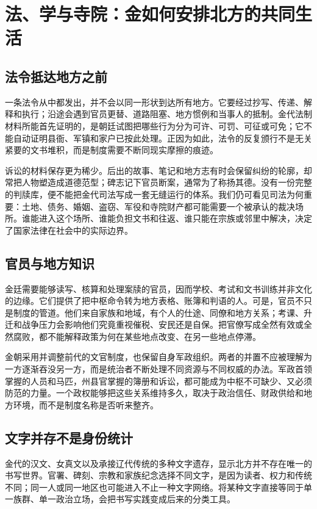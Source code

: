 \section{法、学与寺院：金如何安排北方的共同生活}

\subsection{法令抵达地方之前}

一条法令从中都发出，并不会以同一形状到达所有地方。它要经过抄写、传递、解释和执行；沿途会遇到官员更替、道路阻塞、地方惯例和当事人的抵制。金代法制材料所能首先证明的，是朝廷试图把哪些行为分为可许、可罚、可征或可免；它不能自动证明县衙、军镇和家户已按此处理。正因为如此，法令的反复颁行不是无关紧要的文书堆积，而是制度需要不断同现实摩擦的痕迹。

诉讼的材料保存更为稀少。后出的故事、笔记和地方志有时会保留纠纷的轮廓，却常把人物塑造成道德范型；碑志记下官员断案，通常为了称扬其德。没有一份完整的判牍库，便不能把金代司法写成一套无缝运行的体系。我们仍可看见司法为何重要：土地、债务、婚姻、盗窃、军役和寺院财产都可能需要一个被承认的裁决场所。谁能进入这个场所、谁能负担文书和往返、谁只能在宗族或邻里中解决，决定了国家法律在社会中的实际边界。

\subsection{官员与地方知识}

金廷需要能够读写、核算和处理案牍的官员，因而学校、考试和文书训练并非文化的边缘。它们提供了把中枢命令转为地方表格、账簿和判语的人。可是，官员不只是制度的管道。他们来自家族和地域，有个人的仕途、同僚和地方关系；考课、升迁和战争压力会影响他们究竟重视催税、安民还是自保。把官僚写成全然有效或全然腐败，都不能解释政策为何在某些地点改变、在另一些地点停滞。

金朝采用并调整前代的文官制度，也保留自身军政组织。两者的并置不应被理解为一方逐渐吞没另一方，而是统治者不断处理不同资源与不同权威的办法。军政首领掌握的人员和马匹，州县官掌握的簿册和诉讼，都可能成为中枢不可缺少、又必须防范的力量。一个政权能够把这些关系维持多久，取决于政治信任、财政供给和地方环境，而不是制度名称是否听来整齐。

\subsection{文字并存不是身份统计}

金代的汉文、女真文以及承接辽代传统的多种文字遗存，显示北方并不存在唯一的书写世界。官署、碑刻、宗教和家族纪念选择不同文字，是因为读者、权力和传统不同；同一人或同一地区也可能进入不止一种文字网络。将某种文字直接等同于单一族群、单一政治立场，会把书写实践变成后来的分类工具。

